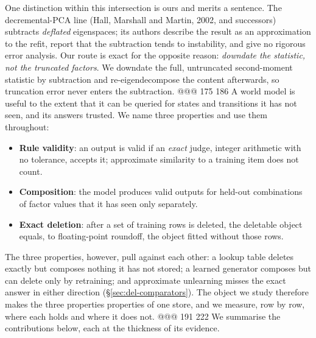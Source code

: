 One distinction within this intersection is ours and merits a sentence. The decremental-PCA
line (Hall, Marshall and Martin, 2002, and successors) subtracts \emph{deflated} eigenspaces;
its authors describe the result as an approximation to the refit, report that the subtraction
tends to instability, and give no rigorous error analysis. Our route is exact for the opposite
reason: \emph{downdate the statistic, not the truncated factors}. We downdate the full,
untruncated second-moment statistic by subtraction and re-eigendecompose the content
afterwards, so truncation error never enters the subtraction.
@@@ 175 186
A world model is useful to the extent that it can be queried for states and transitions it has
not seen, and its answers trusted. We name three properties and use them throughout:
\begin{itemize}[leftmargin=*,nosep]
\item \textbf{Rule validity}: an output is valid if an \emph{exact} judge, integer arithmetic
  with no tolerance, accepts it; approximate similarity to a training item does not count.
\item \textbf{Composition}: the model produces valid outputs for held-out combinations of
  factor values that it has seen only separately.
\item \textbf{Exact deletion}: after a set of training rows is deleted, the deletable object
  equals, to floating-point roundoff, the object fitted without those rows.
\end{itemize}
The three properties, however, pull against each other: a lookup table deletes exactly but
composes nothing it has not stored; a learned generator composes but can delete only by
retraining; and approximate unlearning misses the exact answer in either direction
(\S\ref{sec:del-comparators}). The object we study therefore makes the three properties
properties of one store, and we measure, row by row, where each holds and where it does not.
@@@ 191 222
We summarise the contributions below, each at the thickness of its evidence.
